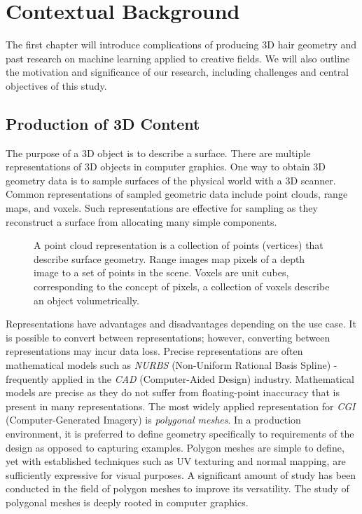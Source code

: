 \documentclass[ %
author={Dillon Keith Diep},
supervisor={Dr. Carl Henrik Ek},
degree={MEng},
title={ART-CG:},
subtitle={Assisted Real-time Content Generation of 3D Hair by Learning Manifolds},
type={Research},
year={2017} ]{dissertation}
\begin{document}
\mainmatter


\chapter{Contextual Background}
\label{chap:context}

The first chapter will introduce complications of producing 3D hair geometry and past research on machine learning applied to creative fields. We will also outline the motivation and significance of our research, including challenges and central objectives of this study.

\section{Production of 3D Content}
The purpose of a 3D object is to describe a surface. There are multiple representations of 3D objects in computer graphics. One way to obtain 3D geometry data is to sample surfaces of the physical world with a 3D scanner. Common representations of sampled geometric data include point clouds, range maps, and voxels. Such representations are effective for sampling as they reconstruct a surface from allocating many simple components.

\begin{figure}[!h]
	\centering
	\caption{A point cloud representation is a collection of points (vertices) that describe surface geometry. Range images map pixels of a depth image to a set of points in the scene. Voxels are unit cubes, corresponding to the concept of pixels, a collection of voxels describe an object volumetrically.}
\end{figure}

Representations have advantages and disadvantages depending on the use case. It is possible to convert between representations; however, converting between representations may incur data loss. Precise representations are often mathematical models such as \textit{NURBS} (Non-Uniform Rational Basis Spline) - frequently applied in the \textit{CAD} (Computer-Aided Design) industry. Mathematical models are precise as they do not suffer from floating-point inaccuracy that is present in many representations. The most widely applied representation for \textit{CGI} (Computer-Generated Imagery) is \textit{polygonal meshes}. In a production environment, it is preferred to define geometry specifically to requirements of the design as opposed to capturing examples. Polygon meshes are simple to define, yet with established techniques such as UV texturing and normal mapping, are sufficiently expressive for visual purposes. A significant amount of study has been conducted in the field of polygon meshes to improve its versatility. The study of polygonal meshes is deeply rooted in computer graphics.
\end{document}
